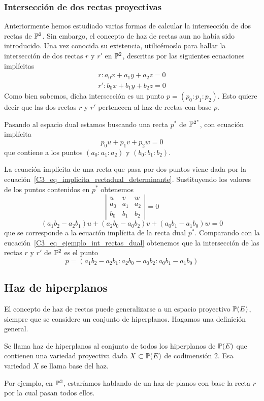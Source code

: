 \subsubsection{Intersección de dos rectas proyectivas}
Anteriormente hemos estudiado varias formas de calcular la intersección de dos rectas de $\mathbb{P}^2$. Sin embargo, el concepto de haz de rectas aun no había sido introducido. Una vez conocida su existencia, utilicémoslo para hallar la intersección de dos rectas $r$ y $r'$ en $\mathbb{P}^2$, descritas por las siguientes ecuaciones implícitas
\begin{equation*}
	\begin{split}
		r:a_0x+a_1y+a_2z=0\\
		r':b_0x+b_1y+b_2z=0
	\end{split}
\end{equation*}
Como bien sabemos, dicha intersección es un punto $p=(p_0:p_1:p_2)$. Esto quiere decir que las dos rectas $r$ y $r'$ pertenecen al haz de rectas con base $p$. 

Pasando al espacio dual estamos buscando una recta $p^*$ de $\mathbb{P}^{2^*}$, con ecuación implícita
\begin{equation}
	\label{C3_eq_ejemplo_int_rectas_dual}
	p_0u+p_1v+p_2w=0
\end{equation}
que contiene a los puntos $(a_0:a_1:a_2)$ y $(b_0:b_1:b_2)$. 

La ecuación implícita de una recta que pasa por dos puntos viene dada por la ecuación~\eqref{C3_eq_implicita_rectadual_determinante}. Sustituyendo los valores de los puntos contenidos en $p^*$ obtenemos
\begin{equation*}
	\left| \begin{array}{ccc}
	u & v & w \\
	a_0 & a_1 & a_2\\
	b_0 & b_1 & b_2
	\end{array}\right| =0
\end{equation*}
\begin{equation*}
	(a_1b_2-a_2b_1)u+(a_2b_0-a_0b_2)v+(a_0b_1-a_1b_0)w=0
\end{equation*}
que se corresponde a la ecuación implícita de la recta dual $p^*$. Comparando con la eucación~\eqref{C3_eq_ejemplo_int_rectas_dual} obtenemos que la intersección de las rectas $r$ y $r'$ de $\mathbb{P}^2$ es el punto
\begin{equation*}
	p=(a_1b_2-a_2b_1:a_2b_0-a_0b_2:a_0b_1-a_1b_0)
\end{equation*}
\subsection{Haz de hiperplanos}
El concepto de haz de rectas puede generalizarse a un espacio proyectivo $\mathbb{P}(E)$, siempre que se considere un conjunto de hiperplanos. Hagamos una definición general.
\begin{defi}
	Se llama haz de hiperplanos al conjunto de todos los hiperplanos de $\mathbb{P}(E)$ que contienen una variedad proyectiva dada $X\subset\mathbb{P}(E)$ de codimensión $2$. Esa variedad $X$ se llama base del haz.
\end{defi}
Por ejemplo, en $\mathbb{P}^3$, estaríamos hablando de un haz de planos con base la recta $r$ por la cual pasan todos ellos.

